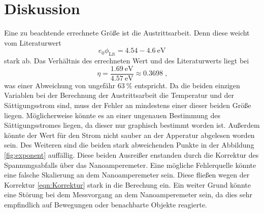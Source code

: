 \section{Diskussion}
\label{sec:Diskussion}
Eine zu beachtende errechnete Größe ist die Austrittsarbeit. Denn diese weicht vom Literaturwert\cite{lit}
\begin{equation*}
    e_0\phi_\text{Lit} =  \num{4.54} - \SI{4.6}{\electronvolt}
\end{equation*}
stark ab. Das Verhältnis des errechneten Wert und des Literaturwerts liegt bei
\begin{equation*}
    \eta = \frac{\SI{1.69}{\electronvolt}}{\SI{4.57}{\electronvolt}} \approx \num{0.3698} \; \text{,}
\end{equation*}
was einer Abweichung von ungefähr $\SI{63}{\percent}$ entspricht.
Da die beiden einzigen Variablen bei der Berechnung der Austrittsarbeit die Temperatur und der Sättigungsstrom sind, muss der Fehler an mindestens 
einer dieser beiden Größe liegen. Möglicherweise könnte es an einer ungenauen Bestimmung des Sättigungsstromes liegen, da dieser nur graphisch bestimmt worden ist. 
Außerdem könnte der Wert für den Strom nicht sauber an der Apperatur abgelesen worden sein.
Des Weiteren sind die beiden stark abweichenden Punkte in der Abbildung \ref{fig:exponent} auffällig. 
Diese beiden Ausreißer enstanden durch die Korrektur des Spannungsabfalls über das Nanoamperemeter.
Eine mögliche Fehlerquelle könnte eine falsche Skalierung an dem Nanoamperemeter sein. 
Diese fließen wegen der Korrektur \eqref{eqn:Korrektur} stark in die Berechung ein.
Ein weiter Grund könnte eine Störung bei dem Messvorgang an dem Nanoamperemeter sein, da dies sehr empfindlich auf Bewegungen oder 
benachbarte Objekte reagierte.